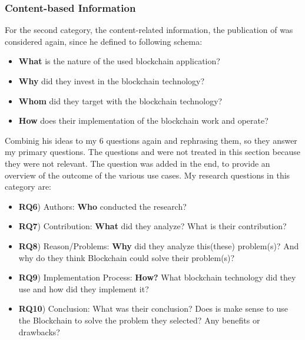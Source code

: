 \subsubsection{Content-based Information}
For the second category, the content-related information, the publication of \citet{2018_Li} was considered again, since he defined to following schema:
\begin{itemize}[noitemsep]
	\item \textbf{What} is the nature of the used blockchain application?
	\item \textbf{Why} did they invest in the blockchain technology?
	\item \textbf{Whom} did they target with the blockchain technology?
	\item \textbf{How} does their implementation of the blockchain work and operate?
\end{itemize}
Combinig his ideas to my 6 questions again and rephrasing them, so they answer my primary questions. The questions  and  were not treated in this section because they were not relevant. The question  was added in the end, to provide an overview of the outcome of the various use cases.
My research questions in this category are:
\begin{itemize}[noitemsep]
	\item \textbf{RQ6}) Authors: \textbf{Who} conducted the research?
	\item \textbf{RQ7}) Contribution: \textbf{What} did they analyze? What is their contribution?
	\item \textbf{RQ8}) Reason/Problems: \textbf{Why} did they analyze this(these) problem(s)? And why do they think Blockchain could solve their problem(s)?
	\item \textbf{RQ9}) Implementation Process: \textbf{How?} What blockchain technology did they use and how did they implement it?
	\item \textbf{RQ10}) Conclusion: What was their conclusion? Does is make sense to use the Blockchain to solve the problem they selected? Any benefits or drawbacks?
\end{itemize}